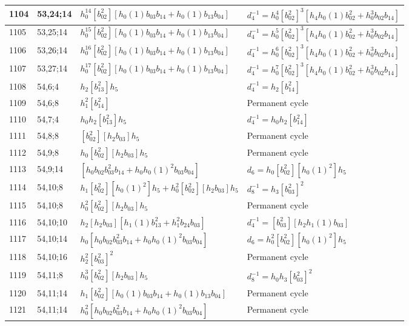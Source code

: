 \documentclass{article}
\begin{document}
\begin{longtable}{|l|l|>{\raggedright\arraybackslash}p{6cm}|>{\raggedright\arraybackslash}p{6cm}|}
\hline
1104 & 53,24;14 & $h_0^{14}[b_{02}^2][h_0(1)b_{03}b_{14} + h_0(1)b_{13}b_{04}]$ & $d_{4}^{-1}=h_0^4[b_{02}^2]^3[h_4h_0(1)b_{02}^2 + h_0^3b_{02}b_{14}]$\\
\hline
1105 & 53,25;14 & $h_0^{15}[b_{02}^2][h_0(1)b_{03}b_{14} + h_0(1)b_{13}b_{04}]$ & $d_{4}^{-1}=h_0^5[b_{02}^2]^3[h_4h_0(1)b_{02}^2 + h_0^3b_{02}b_{14}]$\\
\hline
1106 & 53,26;14 & $h_0^{16}[b_{02}^2][h_0(1)b_{03}b_{14} + h_0(1)b_{13}b_{04}]$ & $d_{4}^{-1}=h_0^6[b_{02}^2]^3[h_4h_0(1)b_{02}^2 + h_0^3b_{02}b_{14}]$\\
\hline
1107 & 53,27;14 & $h_0^{17}[b_{02}^2][h_0(1)b_{03}b_{14} + h_0(1)b_{13}b_{04}]$ & $d_{4}^{-1}=h_0^7[b_{02}^2]^3[h_4h_0(1)b_{02}^2 + h_0^3b_{02}b_{14}]$\\
\hline
1108 & 54,6;4 & $h_2[b_{13}^2]h_5$ & $d_{4}^{-1}=h_2[b_{14}^2]$\\
\hline
1109 & 54,6;8 & $h_1^2[b_{14}^2]$ & Permanent cycle\\
\hline
1110 & 54,7;4 & $h_0h_2[b_{13}^2]h_5$ & $d_{4}^{-1}=h_0h_2[b_{14}^2]$\\
\hline
1111 & 54,8;8 & $[b_{02}^2][h_2b_{03}]h_5$ & Permanent cycle\\
\hline
1112 & 54,9;8 & $h_0[b_{02}^2][h_2b_{03}]h_5$ & Permanent cycle\\
\hline
1113 & 54,9;14 & $[h_0b_{02}b_{03}^2b_{14} + h_0h_0(1)^2b_{03}b_{04}]$ &$d_{6}=h_0[b_{02}^2][h_0(1)^2]h_5$\\
\hline
1114 & 54,10;8 & $h_1[b_{02}^2][h_0(1)^2]h_5 + h_0^2[b_{02}^2][h_2b_{03}]h_5$ & $d_{8}^{-1}=h_3[b_{03}^2]^2$\\
1115 & 54,10;8 & $h_0^2[b_{02}^2][h_2b_{03}]h_5$ & Permanent cycle\\
\hline
1116 & 54,10;10 & $h_2[h_2b_{03}][h_1(1)b_{13}^2 + h_1^2b_{24}b_{03}]$ & $d_{4}^{-1}=[b_{03}^2][h_2h_1(1)b_{03}]$\\
\hline
1117 & 54,10;14 & $h_0[h_0b_{02}b_{03}^2b_{14} + h_0h_0(1)^2b_{03}b_{04}]$ &$d_{6}=h_0^2[b_{02}^2][h_0(1)^2]h_5$\\
\hline
1118 & 54,10;16 & $h_2^2[b_{03}^2]^2$ & Permanent cycle\\
\hline
1119 & 54,11;8 & $h_0^3[b_{02}^2][h_2b_{03}]h_5$ & $d_{8}^{-1}=h_0h_3[b_{03}^2]^2$\\
\hline
1120 & 54,11;14 & $h_1[b_{02}^2][h_0(1)b_{03}b_{14} + h_0(1)b_{13}b_{04}]$ & Permanent cycle\\
1121 & 54,11;14 & $h_0^2[h_0b_{02}b_{03}^2b_{14} + h_0h_0(1)^2b_{03}b_{04}]$ & Permanent cycle\\

\end{longtable}
\end{document}

